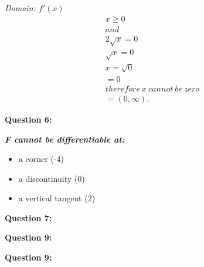 \documentclass{report}
\begin{document}
    \bigbreak \noindent 
    \textit{Domain: $f\prime(x)$}
    \begin{align*}
      x \geq 0 \\
      and\ \\ 
      2\sqrt{x} = 0 \\
       \sqrt{x} = 0 \\
       x = \sqrt{0} \\ 
      = 0\\ therefore\ x\ cannot\ be\ zero \\
      = (0, \infty)
    .\end{align*}
    \bigbreak \noindent \bigbreak \noindent \bigbreak \noindent 
    \begin{Large}
        \textbf{Question 6:}
    \end{Large}
    \bigbreak \noindent 
    \bigbreak \noindent 
    \textbf{\textit{F cannot be differentiable at:}}
    \begin{itemize}
      \item a corner (-4)
      \item a discontinuity (0)
      \item a vertical tangent (2)
    \end{itemize}

    \bigbreak \noindent \bigbreak \noindent \bigbreak \noindent 
    \begin{Large}
        \textbf{Question 7:}
    \end{Large}
    \bigbreak \noindent 
    \bigbreak \noindent 

    \bigbreak \noindent \bigbreak \noindent \bigbreak \noindent 
    \begin{Large}
        \textbf{Question 9:}
    \end{Large}
    \bigbreak \noindent 
    \bigbreak \noindent 

    \bigbreak \noindent \bigbreak \noindent \bigbreak \noindent 
    \begin{Large}
        \textbf{Question 9:}
    \end{Large}
    \bigbreak \noindent 
    \bigbreak \noindent 
    
\end{document}
